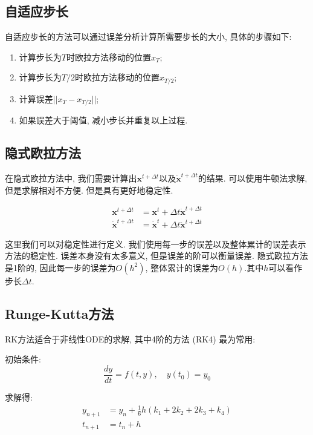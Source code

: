 \documentclass[openany]{progbookcn}
\begin{document}
\subsection{自适应步长}

自适应步长的方法可以通过误差分析计算所需要步长的大小, 具体的步骤如下: 

\begin{enumerate}
	\item 计算步长为$T$时欧拉方法移动的位置$x_T$; 
	\item 计算步长为$T/2$时欧拉方法移动的位置$x_{T/2}$; 
	\item 计算误差$||x_T-x_{T/2}||$; 
	\item 如果误差大于阈值, 减小步长并重复以上过程. 
\end{enumerate}

\subsection{隐式欧拉方法}

在隐式欧拉方法中, 我们需要计算出$\mathbf{x}^{t+\Delta t}$以及$\dot{\mathbf{x}}^{t+\Delta t} $的结果. 可以使用牛顿法求解, 但是求解相对不方便. 但是具有更好地稳定性. 

\begin{equation}
	\begin{split}
		\mathbf{x}^{t+\Delta t} &=\mathbf{x}^{t}+\Delta t \dot{\mathbf{x}}^{t+\Delta t} \\
		\dot{\mathbf{x}}^{t+\Delta t} &=\dot{\mathbf{x}}^{t}+\Delta t \ddot{\mathbf{x}}^{t+\Delta t}
	\end{split}
\end{equation}

这里我们可以对稳定性进行定义. 我们使用每一步的误差以及整体累计的误差表示方法的稳定性. 误差本身没有太多意义, 但是误差的阶可以衡量误差. 隐式欧拉方法是1阶的, 因此每一步的误差为$O(h^2)$, 整体累计的误差为$O(h)$.其中$h$可以看作步长$\Delta t$.

\subsection{Runge-Kutta方法}

RK方法适合于非线性ODE的求解, 其中4阶的方法 (RK4) 最为常用: 

初始条件: 
\begin{equation}
	\frac{d y}{d t}=f(t, y), \quad y\left(t_{0}\right)=y_{0}
\end{equation}

求解得: 
\begin{equation}
	\begin{split}
		y_{n+1}&=y_{n}+\frac{1}{6} h\left(k_{1}+2 k_{2}+2 k_{3}+k_{4}\right) \\
		t_{n+1}&=t_{n}+h
	\end{split}
\end{equation}
\end{document}
